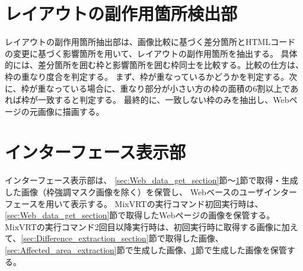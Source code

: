 \section{レイアウトの副作用箇所検出部}\label{sec:Layout_subEffect_extraction_section}
レイアウトの副作用箇所抽出部は、画像比較に基づく差分箇所とHTMLコードの変更に基づく影響箇所を用いて、レイアウトの副作用箇所を抽出する。
具体的には、差分箇所を囲む枠と影響箇所を囲む枠同士を比較する。比較の仕方は、枠の重なり度合を判定する。
まず、枠が重なっているかどうかを判定する。次に、枠が重なっている場合に、重なり部分が小さい方の枠の面積の6割以上であれば枠が一致すると判定する。
最終的に、一致しない枠のみを抽出し、Webページの元画像に描画する。


\section{インターフェース表示部}\label{sec:Interface_Display_Section}
インターフェース表示部は、
\ref{sec:Web_data_get_section}節～\ref{sec:Layout_subEffect_extraction_section}節で取得・生成した画像（枠強調マスク画像を除く）を保管し、
Webベースのユーザインターフェースを用いて表示する。
MixVRTの実行コマンド初回実行時は、\ref{sec:Web_data_get_section}節で取得したWebページの画像を保管する。
MixVRTの実行コマンド2回目以降実行時は、初回実行時に取得する画像に加えて、\ref{sec:Difference_extraction_section}節で取得した画像、
\ref{sec:Affected_area_extraction}節で生成した画像、\ref{sec:Layout_subEffect_extraction_section}節で生成した画像を保管する。








